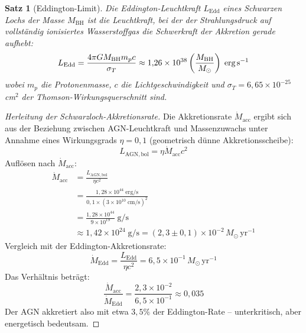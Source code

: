﻿\documentclass[12pt,a4paper]{report}
\newtheorem{theorem}{Satz}[chapter]
\begin{document}
\begin{theorem}[Eddington-Limit]
	Die Eddington-Leuchtkraft $L_\mathrm{Edd}$ eines Schwarzen Lochs der Masse $M_\mathrm{BH}$ ist die Leucht\-kraft, bei der der Strahlungsdruck auf vollständig ionisiertes Wasserstoffgas die Schwer\-kraft der Akkretion gerade aufhebt:
	\begin{equation}
		L_\mathrm{Edd} = \frac{4\pi G M_\mathrm{BH} m_p c}{\sigma_T} \approx 1{,}26 \times 10^{38} \left(\frac{M_\mathrm{BH}}{M_\odot}\right)\;\text{erg\,s}^{-1}
	\end{equation}
	wobei $m_p$ die Protonenmasse, $c$ die Lichtgeschwindigkeit und $\sigma_T = 6{,}65 \times 10^{-25}$\,cm$^2$ der Thomson-Wirkungsquerschnitt sind.
\end{theorem}

\begin{proof}[Herleitung der Schwarzloch-Akkretionsrate]
	Die Akkretionsrate $\dot{M}_\mathrm{acc}$ ergibt sich aus der Beziehung zwischen AGN-Leuchtkraft und Massen\-zuwachs unter Annahme eines Wirkungsgrads $\eta = 0{,}1$ (geometrisch dünne Akkretionsscheibe):
	\begin{equation}
		L_\mathrm{AGN,bol} = \eta \dot{M}_\mathrm{acc} c^2
	\end{equation}
	Auflösen nach $\dot{M}_\mathrm{acc}$:
	\begin{align}
		\dot{M}_\mathrm{acc} &= \frac{L_\mathrm{AGN,bol}}{\eta c^2} \\
		&= \frac{1{,}28 \times 10^{44}\;\text{erg/s}}{0{,}1 \times (3 \times 10^{10}\;\text{cm/s})^2} \\
		&= \frac{1{,}28 \times 10^{44}}{9 \times 10^{19}}\;\text{g/s} \\
		&\approx 1{,}42 \times 10^{24}\;\text{g/s} = (2{,}3 \pm 0{,}1) \times 10^{-2}\,M_\odot\,\text{yr}^{-1}
	\end{align}
	Vergleich mit der Eddington-Akkretionsrate:
	\begin{equation}
		\dot{M}_\mathrm{Edd} = \frac{L_\mathrm{Edd}}{\eta c^2} = 6{,}5 \times 10^{-1}\,M_\odot\,\text{yr}^{-1}
	\end{equation}
	Das Verhältnis beträgt:
	\begin{equation}
		\frac{\dot{M}_\mathrm{acc}}{\dot{M}_\mathrm{Edd}} = \frac{2{,}3 \times 10^{-2}}{6{,}5 \times 10^{-1}} \approx 0{,}035
	\end{equation}
	Der AGN akkretiert also mit etwa $3{,}5\%$ der Eddington-Rate -- unterkritisch, aber energetisch bedeutsam.
\end{proof}
\end{document}
